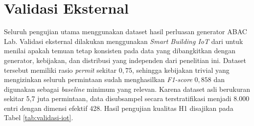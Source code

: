 \section{Validasi Eksternal}

Seluruh pengujian utama menggunakan dataset hasil perluasan generator ABAC Lab. 
Validasi eksternal dilakukan menggunakan \textit{Smart Building IoT} dari \textcite{diaz-rodriguez_abac_2025} untuk menilai apakah temuan tetap konsisten pada data yang dibangkitkan dengan generator, kebijakan, dan distribusi yang independen dari penelitian ini.
Dataset tersebut memiliki rasio \textit{permit} sekitar $0,75$, sehingga kebijakan trivial yang mengizinkan seluruh permintaan sudah menghasilkan \textit{F1-score} $0,858$ dan digunakan sebagai \textit{baseline} minimum yang relevan. 
Karena dataset asli berukuran sekitar 5,7 juta permintaan, data disubsampel secara terstratifikasi menjadi 8.000 entri dengan dimensi efektif 428. 
Hasil pengujian kualitas H1 disajikan pada Tabel \ref{tab:validasi-iot}.

